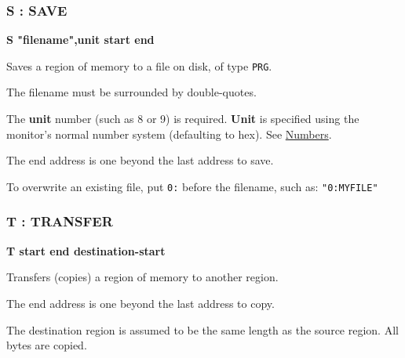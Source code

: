 
\subsubsection{S : SAVE}
\begin{description}[leftmargin=2cm,style=nextline]
\item [Format:] {\bf S "filename",unit start end}
\item [Usage:] Saves a region of memory to a file on disk, of type {\tt PRG}.

\item [Remarks:] The filename must be surrounded by double-quotes.

    The {\bf unit} number (such as 8 or 9) is required. {\bf Unit} is specified using the monitor's normal number system (defaulting to hex). See \hyperref[sec:numbers]{Numbers}.

    The end address is one beyond the last address to save.

    To overwrite an existing file, put {\tt 0:} before the filename, such as: {\tt "0:MYFILE"}

\end{description}


\subsubsection{T : TRANSFER}
\begin{description}[leftmargin=2cm,style=nextline]
\item [Format:] {\bf T start end destination-start}
\item [Usage:] Transfers (copies) a region of memory to another region.

\item [Remarks:] The end address is one beyond the last address to copy.

    The destination region is assumed to be the same length as the source region. All bytes are copied.

\end{description}


